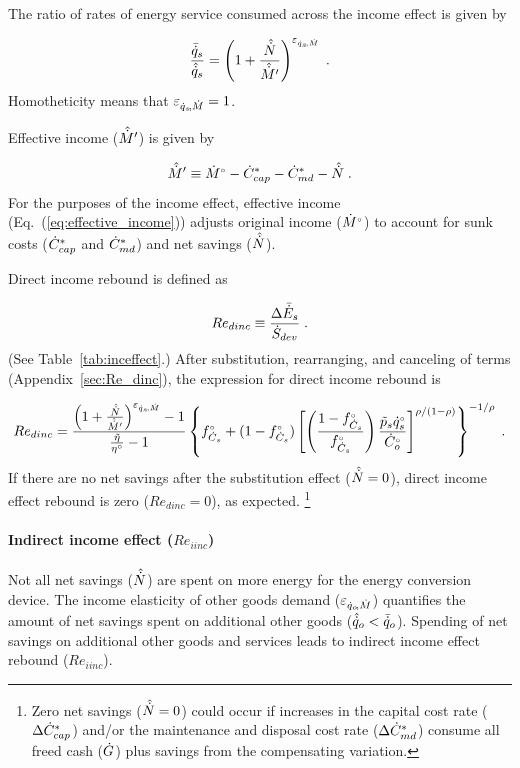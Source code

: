 \documentclass[12pt]{article}\usepackage[]{graphicx}\usepackage[]{xcolor}
\begin{document}
The ratio of rates of energy service consumed across the income effect is given by

\begin{equation} \label{eq:qsrat_eqsM}
  \frac{\bar{\dot{q}}_s}{\hat{\dot{q}}_s} = \left( 1 + \frac{\hat{\dot{N}}}{\hat{\dot{M}}^\prime} \right) ^{\varepsilon_{\dot{q}_s\!,\dot{M}}} \; .
\end{equation}
%
Homotheticity means that $\varepsilon_{\dot{q}_s\!,\dot{M}} = 1$. 

Effective income ($\hat{\dot{M}}^\prime$) is given by 

\begin{equation} \label{eq:effective_income}
  \hat{\dot{M}}^\prime \equiv {}{\dot{M}}^{\scriptscriptstyle \circ} - {\dot{C}}^*_{cap} - {\dot{C}}^*_{md} - \hat{\dot{N}}{} \; .
\end{equation}
%
For the purposes of the income effect, 
effective income (Eq.~(\ref{eq:effective_income})) 
adjusts original income (${}{\dot{M}}^{\scriptscriptstyle \circ}$) to account for 
sunk costs (${\dot{C}}^*_{cap}$ and ${\dot{C}}^*_{md}$) and
net savings ($\hat{\dot{N}}$).

Direct income rebound is defined as

\begin{equation} \label{eq:Re_dinc_def}
  Re_{dinc} \equiv \frac{\Delta \bar{\dot{E}}_s}{\dot{S}_{dev}} \; .
\end{equation}
%
(See Table~\ref{tab:inceffect}.)
After substitution, rearranging, and canceling of terms (Appendix~\ref{sec:Re_dinc}), 
the expression for direct income rebound is

\begin{equation} \label{eq:Re_dinc}
  Re_{dinc} = \frac{ \left( 1 + \frac{\hat{\dot{N}}}{\hat{\dot{M}}^\prime} \right) ^{\varepsilon_{\dot{q}_s\!,\dot{M}}} - 1} { \frac{\tilde{\eta}}{{}{\eta}^{\scriptscriptstyle \circ}} - 1 } \left\{ {}{f}^{\scriptscriptstyle \circ}_{\dot{C}_s} + (1-{}{f}^{\scriptscriptstyle \circ}_{\dot{C}_s}) \left[ \left( \frac{1-{}{f}^{\scriptscriptstyle \circ}_{\dot{C}_s}}{{}{f}^{\scriptscriptstyle \circ}_{\dot{C}_s}} \right) \frac{\tilde{p}_s {}{\dot{q}}^{\scriptscriptstyle \circ}_s}{{}{\dot{C}}^{\scriptscriptstyle \circ}_o} \right] ^{\rho / (1 - \rho)} \right\} ^ {-1/\rho}{}{} \; .
\end{equation}
%
If there are no net savings after the substitution effect ($\hat{\dot{N}} = 0$), 
direct income effect rebound is zero ($Re_{dinc} = 0$), as expected.%
\footnote{
  Zero net savings ($\hat{\dot{N}} = 0$) could occur if 
  increases in the capital cost rate ($\Delta {\dot{C}}^*_{cap}$) and/or
  the maintenance and disposal cost rate ($\Delta {\dot{C}}^*_{md}$)
  consume all freed cash ($\dot{G}$) plus savings from the compensating variation.
}


\paragraph{Indirect income effect ($Re_{iinc}$)} 
\label{sec:indirect_income_effect}

Not all net savings ($\hat{\dot{N}}$) are spent on more energy 
for the energy conversion device.
The income elasticity of other goods demand ($\varepsilon_{\dot{q}_o\!,\dot{M}}$)
quantifies the amount of net savings spent 
on additional other goods ($\hat{\dot{q}}_o < \bar{\dot{q}}_o$).
Spending of net savings on additional other goods and services
leads to indirect income effect rebound ($Re_{iinc}$).
\end{document}
